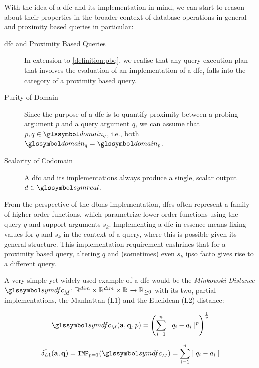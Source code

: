 With the idea of a \acrshort{dfc} and its implementation in mind, we can start to reason about their properties in the broader context of database operations in general and proximity based queries in particular:

\begin{description}
    \item[\acrshort{dfc} and Proximity Based Queries] In extension to \cref{definition:pbq}, we realise that any query execution plan that involves the evaluation of an implementation of a \acrshort{dfc}, falls into the category of a proximity based query.

    \item[Purity of Domain] Since the purpose of a \acrshort{dfc} is to quantify proximity between a probing argument $p$ and a query argument $q$, we can assume that $p, q \in \domain_q$, i.e., both $\domain_q = \domain_p$.

    \item[Scalarity of Codomain] A \acrshort{dfc} and its implementations always produce a single, scalar output $d \in \symreal$. 
\end{description}

From the perspective of the \acrshort{dbms} implementation, \acrshort{dfc}s often represent a family of higher-order functions, which parametrize lower-order functions using the query $q$ and support arguments $s_k$. Implementing a \acrshort{dfc} in essence means fixing values for $q$ and $s_k$ in the context of a query, where this is possible given its general structure. This implementation requirement enshrines that for a proximity based query, altering $q$ and (sometimes) even $s_k$ ipso facto gives rise to a different query. 

A very simple yet widely used example of a \acrshort{dfc} would be the \emph{Minkowski Distance} $\symdfc_{M} \colon \mathbb{R}^{dim} \times \mathbb{R}^{dim} \times \mathbb{R} \to \mathbb{R}_{\geq 0}$ with its two, partial implementations, the Manhattan (L1) and the Euclidean (L2) distance:

\begin{equation}
    \symdfc_{M}(\mathbf{a},\mathbf{q},p) = \left(\sum_{i=1}^{n} \mid q_i - a_i \mid^p\right)^{\frac{1}{p}}
\end{equation}

\begin{equation}
    \hat{\delta_{L1}}(\mathbf{a},\mathbf{q}) = \texttt{IMP}_{p=1}(\symdfc_M) = \sum_{i=1}^{n} \mid q_i - a_i \mid
\end{equation}

